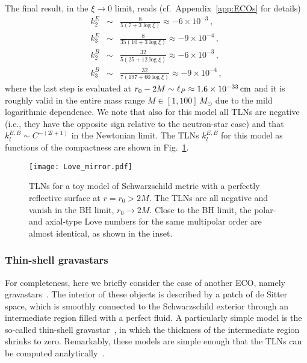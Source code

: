 \documentclass[aps,twocolumn,showpacs,preprintnumbers,nofootinbib,prd,superscriptaddress,groupedaddress,10pt]{revtex4-1}
\begin{document}
The final result, in the $\xi\to0$ limit, reads (cf.\ Appendix~\ref{app:ECOs} for details)
\begin{eqnarray}
 k_2^E &\sim& \frac{8}{5 (7+3 \log\xi)} \approx -6\times 10^{-3}\,,\\
 k_3^E &\sim& \frac{8}{35 (10+3 \log\xi)}\approx -9\times 10^{-4}\,, \\
 k_2^B &\sim&\frac{32}{5 (25+12 \log\xi)}\approx-6\times10^{-3}\,,\\
 k_3^B &\sim&\frac{32}{7 (197+60 \log\xi)}\approx -9\times 10^{-4}\,,
\end{eqnarray}
where the last step is evaluated at $r_0-2M\sim \ell_P\approx 1.6\times 10^{-33}\,{\rm cm}$ and it is roughly valid in the entire mass range $M\in [1,100]\, M_\odot$ due to the mild logarithmic dependence.
%
We note that also for this model all TLNs are negative (i.e., they have the opposite sign relative to the neutron-star case) and that $k^{E,B}_l\sim C^{-(2l+1)}$ in the Newtonian limit. The TLNs $k_l^{E,B}$ for this model as functions of the compactness are shown in Fig.~\ref{fig:mirror}.

\begin{figure}[th]
\texttt{[image: Love\_mirror.pdf]}
\caption{TLNs for a toy model of Schwarzschild metric with a perfectly reflective surface at $r=r_0>2M$. The TLNs are all negative and vanish in the BH limit, $r_0\to 2M$. Close to the BH limit, the polar- and axial-type Love numbers for the same multipolar order are almost identical, as shown in the inset.}\label{fig:mirror}
\end{figure}


\subsubsection{Thin-shell gravastars} \label{sec:GSs}
For completeness, here we briefly consider the case of another ECO, namely gravastars~\cite{Mazur:2001fv}. The interior of these objects is described by a patch of de Sitter space, which is smoothly connected to the Schwarzschild exterior through an intermediate region filled with a perfect fluid. A particularly simple model is the so-called thin-shell gravastar~\cite{Visser:2003ge}, in which the thickness of the intermediate region shrinks to zero. Remarkably, these models are simple enough that the TLNs can be computed analytically~\cite{Pani:2015tga,Uchikata:2016qku}.
\end{document}
